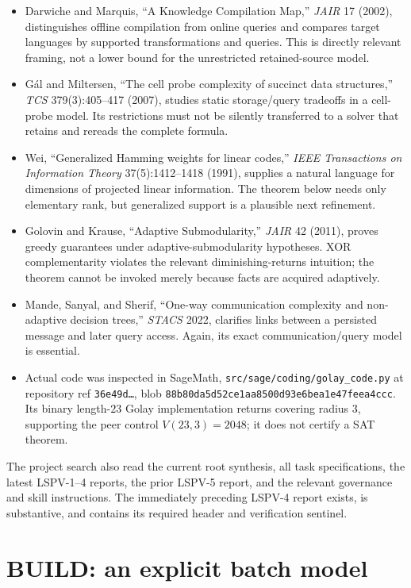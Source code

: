 \documentclass[11pt]{article}
\begin{document}
\begin{itemize}[leftmargin=*]
\item Darwiche and Marquis, ``A Knowledge Compilation Map,'' \emph{JAIR} 17 (2002), distinguishes offline compilation from online queries and compares target languages by supported transformations and queries.  This is directly relevant framing, not a lower bound for the unrestricted retained-source model.
\item G\'al and Miltersen, ``The cell probe complexity of succinct data structures,'' \emph{TCS} 379(3):405--417 (2007), studies static storage/query tradeoffs in a cell-probe model.  Its restrictions must not be silently transferred to a solver that retains and rereads the complete formula.
\item Wei, ``Generalized Hamming weights for linear codes,'' \emph{IEEE Transactions on Information Theory} 37(5):1412--1418 (1991), supplies a natural language for dimensions of projected linear information.  The theorem below needs only elementary rank, but generalized support is a plausible next refinement.
\item Golovin and Krause, ``Adaptive Submodularity,'' \emph{JAIR} 42 (2011), proves greedy guarantees under adaptive-submodularity hypotheses.  XOR complementarity violates the relevant diminishing-returns intuition; the theorem cannot be invoked merely because facts are acquired adaptively.
\item Mande, Sanyal, and Sherif, ``One-way communication complexity and non-adaptive decision trees,'' \emph{STACS} 2022, clarifies links between a persisted message and later query access.  Again, its exact communication/query model is essential.
\item Actual code was inspected in SageMath, \texttt{src/sage/coding/golay\_code.py} at repository ref \texttt{36e49d\ldots}, blob \texttt{88b80da5d52ce1aa8500d93e6bea1e47feea4ccc}.  Its binary length-$23$ Golay implementation returns covering radius $3$, supporting the peer control $V(23,3)=2048$; it does not certify a SAT theorem.
\end{itemize}

The project search also read the current root synthesis, all task specifications, the latest LSPV-1--4 reports, the prior LSPV-5 report, and the relevant governance and skill instructions.  The immediately preceding LSPV-4 report exists, is substantive, and contains its required header and verification sentinel.

\section{BUILD: an explicit batch model}
\end{document}

